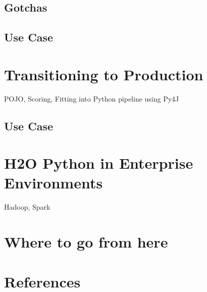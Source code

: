 \subsection{Gotchas}

\subsection{Use Case}

\section{Transitioning to Production}
POJO, Scoring, Fitting into Python pipeline using Py4J

\subsection{Use Case}

\section{H2O Python in Enterprise Environments}
Hadoop, Spark

\section{Where to go from here}


\newpage
\section{References}








\enddocument